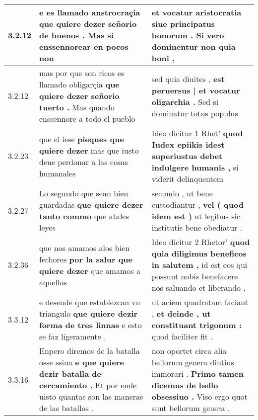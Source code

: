 \begin{tabular}{|p{1cm}|p{6.5cm}|p{6.5cm}|}
3.2.12 & e es llamado anstrocraçia \textbf{ que quiere dezer señorio de buenos . } Mas si enssennorear en pocos non & et vocatur aristocratia \textbf{ siue principatus bonorum . } Si vero dominentur non quia boni , \\\hline
3.2.12 & mas por que son ricos es llamado obligarçia \textbf{ que quiere dezer señorio tuerto . } Mas quando enssennore a todo el pueblo & sed quia diuites , \textbf{ est peruersus | et vocatur oligarchia . } Sed si dominatur totus populus \\\hline
3.2.23 & que el iese \textbf{ pieques que quiere dezer } mas que iusto deue perdonar a las cosas humanales & Ideo dicitur 1 Rhet’ \textbf{ quod Iudex epiikis idest superiustus debet indulgere humanis , } si viderit delinquentem \\\hline
3.2.27 & Lo segundo que sean bien guardadas \textbf{ que quiere dezer tanto commo } que atales leyes & secundo , ut bene custodiantur , \textbf{ vel ( quod idem est ) } ut legibus sic institutis bene obediatur . \\\hline
3.2.36 & que nos amamos alos bien fechores \textbf{ por la salur que quiere dezer } que amamos a aquellos & Ideo dicitur 2 Rhetor’ \textbf{ quod quia diligimus beneficos in salutem , } id est eos qui possunt nobis benefacere nos saluando et liberando , \\\hline
3.3.12 & e desende que establezcan vn triangulo \textbf{ que quiere dezir forma de tres linnas } e esto se faz ligeramente . & ut aciem quadratam faciant , \textbf{ et deinde , ut constituant trigonum : } quod faciliter fit . \\\hline
3.3.16 & Enpero diremos de la batalla osse ssiua \textbf{ e que quiere dezir batalla de cercamiento . } Et por ende uisto quantas son las maneras de las batallas . & non oportet circa alia bellorum genera diutius immorari . \textbf{ Primo tamen dicemus de bello obsessiuo . } Viso ergo quot sunt bellorum genera , \\\hline

\end{tabular}
